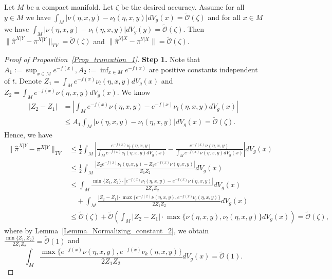 \begin{proposition}\label{Prop_truncation_1}
    Let $M$ be a compact manifold. Let $\zeta$ be the desired accuracy. 
    Assume for all $y \in M$ we have 
    $\int_{M} |\nu(\eta, x, y) - \nu_{l}(\eta, x, y)| dV_{g}(x) = \tilde{\mathcal{O}}(\zeta)$ 
    and for all $x \in M$ we have $\int_{M} |\nu(\eta, x, y) - \nu_{l}(\eta, x, y)| dV_{g}(y) = \tilde{\mathcal{O}}(\zeta)$.
    Then $\|\hat{\pi}^{X|Y} - \pi^{X|Y}\|_{TV} = \tilde{\mathcal{O}}(\zeta)$ 
    and $\|\hat{\pi}^{Y|X} - \pi^{Y|X}\| = \tilde{\mathcal{O}}(\zeta)$.
\end{proposition}
\begin{proof}[Proof of Proposition~\ref{Prop_truncation_1}]

    \textbf{Step 1.} Note that $A_{1} := \sup_{x \in M} e^{-f(x)}, A_{2} := \inf_{x \in M} e^{-f(x)}$ are positive constants independent of $t$.
    Denote $Z_{1} = \int_{M} e^{-f(x)} \nu_{l}(\eta, x, y) dV_{g}(x)$ 
    and $Z_{2} = \int_{M} e^{-f(x)}\nu(\eta, x, y) dV_{g}(x)$.
    We know 
    \begin{align*}
            |Z_{2} - Z_{1}| &= 
            |\int_{M} e^{-f(x)}\nu(\eta, x, y) - e^{-f(x)} \nu_{l}(\eta, x, y) dV_{g}(x)| \\
            &\le A_{1} \int_{M} |\nu(\eta, x, y) - \nu_{l}(\eta, x, y)| dV_{g}(x)
            = \tilde{\mathcal{O}}(\zeta).
    \end{align*}
    Hence, we have
    \begin{align*}
            \|\hat{\pi}^{X|Y} - \pi^{X|Y}\|_{TV}
        &\le \frac{1}{2} \int_{M} | \frac{e^{-f(x)} \nu_{l}(\eta, x, y)}{\int_{M} e^{-f(x)} \nu_{l}(\eta, x, y) dV_{g}(x)} 
        - \frac{e^{-f(x)}\nu(\eta, x, y)}{\int_{M} e^{-f(x)}\nu(\eta, x, y) dV_{g}(x)} | dV_{g}(x) \\
        &\le \frac{1}{2} \int_{M} \frac{|Z_{2}e^{-f(x)} \nu_{l}(\eta, x, y) - Z_{1}e^{-f(x)}\nu(\eta, x, y)|}{Z_{1}Z_{2}} dV_{g}(x)\\
        &\le \int_{M} \frac{\min\{Z_{1}, Z_{2}\} \cdot |e^{-f(x)} \nu_{l}(\eta, x, y) - e^{-f(x)}\nu(\eta, x, y)| }{2Z_{1}Z_{2}} dV_{g}(x) \\
        &\quad + \int_{M} \frac{|Z_{2} - Z_{1}| \cdot \max\{e^{-f(x)}\nu(\eta, x, y), e^{-f(x)} \nu_{l}(\eta, x, y)\}}{2Z_{1}Z_{2}} dV_{g}(x)\\
        &\le \tilde{\mathcal{O}}(\zeta) + \tilde{\mathcal{O}}(\int_{M} |Z_{2} - Z_{1}| \cdot \max\{\nu(\eta, x, y), \nu_{l}(\eta, x, y)\} dV_{g}(x)) 
        = \tilde{\mathcal{O}}(\zeta),
    \end{align*}
    where by Lemma~\ref{Lemma_Normalizing_constant_2}, we obtain  $\frac{\min\{Z_{1}, Z_{2}\} }{2Z_{1}Z_{2}} = \tilde{\mathcal{O}}(1)$
    and $$\int_{M} \frac{\max\{e^{-f(x)}\nu(\eta, x, y), e^{-f(x)} \nu_{k}(\eta, x, y)\}}{2Z_{1}Z_{2}} dV_{g}(x) = \tilde{\mathcal{O}}(1).$$
\vspace{0.2in}


\end{proof}
